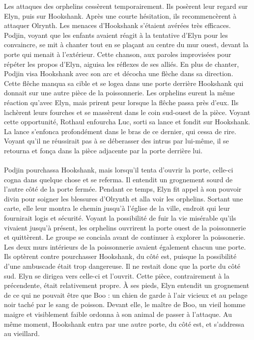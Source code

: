 \documentclass[main.tex]{subfiles}
\begin{document}
    Les attaques des orphelins cessèrent temporairement.
    Ils posèrent leur regard sur Elyn, puis sur Hookshank.
    Après une courte hésitation, ils recommencèrent à attaquer Olrynth.
    Les menaces d'Hookshank s'étaient avérées très efficaces.
    Podjin, voyant que les enfants avaient réagit à la tentative d'Elyn pour les convaincre, se mit à chanter tout en se plaçant au centre du mur ouest, devant la porte qui menait à l'extérieur.
    Cette chanson, aux paroles improvisées pour répéter les propos d'Elyn, aiguisa les réflexes de ses alliés.
    En plus de chanter, Podjin visa Hookshank avec son arc et décocha une flèche dans sa direction.
    Cette flêche manqua sa cible et se logea dans une porte derrière Hookshank qui donnait sur une autre pièce de la poissonnerie.
    Les orphelins eurent la même réaction qu'avec Elyn, mais prirent peur lorsque la flêche passa près d'eux.
    Ils lachèrent leurs fourches et se massèrent dans le coin sud-ouest de la pièce.
    Voyant cette opportunité, Rothaul enfourcha Luc, sorti sa lance et fondit sur Hookshank.
    La lance s'enfonca profondément dans le bras de ce dernier, qui cessa de rire.
    Voyant qu'il ne réussirait pas à se déberasser des intrus par lui-même, il se retourna et fonça dans la pièce adjacente par la porte derrière lui.\\
    \\
    Podjin pourchassa Hookshank, mais lorsqu'il tenta d'ouvrir la porte, celle-ci cogna dans quelque chose et se referma.
    Il entendit un grognement sourd de l'autre côté de la porte fermée.
    Pendant ce temps, Elyn fit appel à son pouvoir divin pour soigner les blessures d'Olrynth et alla voir les orphelins.
    Sortant une carte, elle leur montra le chemin jusqu'à l'église de la ville, endroit qui leur fournirait logis et sécurité.
    Voyant la possibilité de fuir la vie misérable qu'ils vivaient jusqu'à présent, les orphelins ouvrirent la porte ouest de la poissonnerie et quittèrent.
    Le groupe se conciala avant de continuer à explorer la poissonerie.
    Les deux murs intérieurs de la poissonnerie avaient également chacun une porte.
    Ils optèrent contre pourchasser Hookshank, du côté est, puisque la possibilité d'une ambuscade était trop dangereuse.
    Il ne restait donc que la porte du côté sud.
    Elyn se dirigea vers celle-ci et l'ouvrit.
    Cette pièce, contrairement à la précendente, était relativement propre.
    À ses pieds, Elyn entendit un grognement de ce qui ne pouvait être que Boo : un chien de garde à l'air vicieux et au pelage noir taché par le sang de poisson.
    Devant elle, le maître de Boo, un vieil homme maigre et visiblement faible ordonna à son animal de passer à l'attaque.
    Au même moment, Hookshank entra par une autre porte, du côté est, et s'addressa au vieillard.
    \\
    \\
\end{document}
